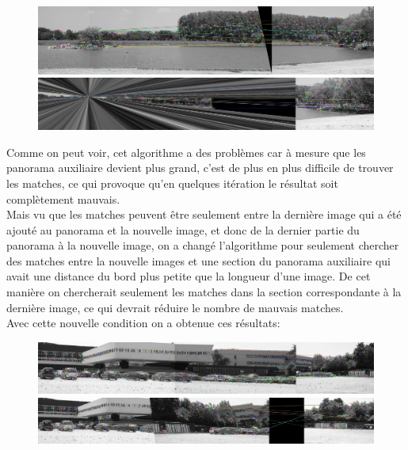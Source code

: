 \documentclass[11pt]{article}
\begin{document}
\begin{figure}[H]
\centering
\includegraphics[width=.8\textwidth]{../resources/output/iterative_panorama2.jpg}
\includegraphics[width=.8\textwidth]{../resources/output/iterative_panorama3.jpg}
\end{figure}

Comme on peut voir, cet algorithme a des problèmes car à mesure que les panorama auxiliaire devient plus grand, c’est de plus en plus difficile de trouver les matches, ce qui provoque qu’en quelques itération le résultat soit complètement mauvais. \\
Mais vu que les matches peuvent être seulement entre la dernière image qui a été ajouté au panorama et la nouvelle image, et donc de la dernier partie du panorama à la nouvelle image, on a changé l’algorithme pour seulement chercher des matches entre la nouvelle images et une section du panorama auxiliaire qui avait une distance du bord plus petite que la longueur d’une image. De cet manière on chercherait seulement les matches dans la section correspondante à la dernière image, ce qui devrait réduire le nombre de mauvais matches.\\
Avec cette nouvelle condition on a obtenue ces résultats: 

\begin{figure}[H]
\centering
\includegraphics[width=.8\textwidth]{../resources/output/iterative_panorama_filtered3.jpg}
\includegraphics[width=.8\textwidth]{../resources/output/iterative_panorama_filtered4.jpg}
\end{figure}
\end{document}
